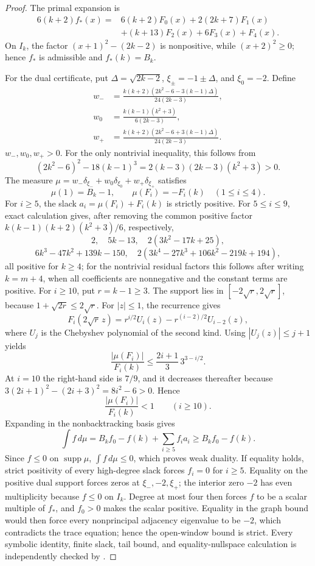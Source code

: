 \documentclass[a4paper,10pt,reqno]{amsart}
\theoremstyle{plain}
\theoremstyle{definition}
\theoremstyle{remark}
\newcommand{\RepoTag}{v2.2.6}
\newcommand{\codefile}[1]{%
  \href{https://github.com/SamPetkov/wow284/blob/\RepoTag/#1}{\path{#1}}}
\begin{document}
\begin{proof}
The primal expansion is
\[
\begin{aligned}
6(k+2)f_*(x)={}&6(k+2)F_0(x)+2(2k+7)F_1(x)\\
&+(k+13)F_2(x)+6F_3(x)+F_4(x).
\end{aligned}
\]
On \(I_k\), the factor \((x+1)^2-(2k-2)\) is nonpositive, while
\((x+2)^2\ge0\); hence \(f_*\) is admissible and \(f_*(k)=B_k\).

For the dual certificate, put \(\Delta=\sqrt{2k-2}\),
\(\xi_\pm=-1\pm\Delta\), and \(\xi_0=-2\).  Define
\begin{align*}
w_-&=\frac{k(k+2)(2k^2-6-3(k-1)\Delta)}{24(2k-3)},\\
w_0&=\frac{k(k-1)(k^2+3)}{6(2k-3)},\\
w_+&=\frac{k(k+2)(2k^2-6+3(k-1)\Delta)}{24(2k-3)}.
\end{align*}
\(w_-,w_0,w_+>0\).  For the only nontrivial inequality, this follows from
\[
 (2k^2-6)^2-18(k-1)^3
 =2(k-3)(2k-3)(k^2+3)>0.
\]
The measure
\(\mu=w_-\delta_{\xi_-}+w_0\delta_{\xi_0}+w_+\delta_{\xi_+}\) satisfies
\[
 \mu(1)=B_k-1,
 \qquad \mu(F_i)=-F_i(k)\quad(1\le i\le4).
\]
For \(i\ge5\), the slack \(a_i=\mu(F_i)+F_i(k)\) is strictly positive.  For
\(5\le i\le9\), exact calculation gives, after removing the common positive
factor \(k(k-1)(k+2)(k^2+3)/6\), respectively,
\[
 2,\quad 5k-13,\quad 2(3k^2-17k+25),
\]
\[
 6k^3-47k^2+139k-150,
 \quad
 2(3k^4-27k^3+106k^2-219k+194),
\]
all positive for \(k\ge4\); for the nontrivial residual factors this follows
after writing \(k=m+4\), when all coefficients are nonnegative and the
constant terms are positive.  For \(i\ge10\), put \(r=k-1\ge3\).
The support lies in \([-2\sqrt r,2\sqrt r]\), because
\(1+\sqrt{2r}\le2\sqrt r\).  For \(|z|\le1\), the recurrence gives
\[
 F_i(2\sqrt r\,z)
 =r^{i/2}U_i(z)-r^{(i-2)/2}U_{i-2}(z),
\]
where \(U_j\) is the Chebyshev polynomial of the second kind.  Using
\(|U_j(z)|\le j+1\) yields
\[
 \frac{|\mu(F_i)|}{F_i(k)}
 \le \frac{2i+1}{3}\,3^{3-i/2}.
\]
At \(i=10\) the right-hand side is \(7/9\), and it decreases thereafter
because \(3(2i+1)^2-(2i+3)^2=8i^2-6>0\).  Hence
\[
 \frac{|\mu(F_i)|}{F_i(k)}<1\qquad(i\ge10).
\]
Expanding in the nonbacktracking basis gives
\[
 \int f\,d\mu
 =B_kf_0-f(k)+\sum_{i\ge5}f_i a_i
 \ge B_kf_0-f(k).
\]
Since \(f\le0\) on \(\operatorname{supp}\mu\),
\(\int f\,d\mu\le0\), which proves weak duality.
If equality holds, strict positivity of every high-degree slack forces
\(f_i=0\) for \(i\ge5\).  Equality on the positive dual support forces zeros
at \(\xi_-,-2,\xi_+\); the interior zero \(-2\) has even multiplicity because
\(f\le0\) on \(I_k\).  Degree at most four then forces \(f\) to be a scalar
multiple of \(f_*\), and \(f_0>0\) makes the scalar positive.  Equality in
the graph bound would then force every nonprincipal adjacency eigenvalue to be
\(-2\), which contradicts the trace equation; hence the open-window bound is
strict.  Every symbolic identity, finite slack, tail bound, and
equality-nullspace calculation is independently checked by
\codefile{scripts/verify_proof_audit_02_two_sided_lp.py}.
\end{proof}
\end{document}
